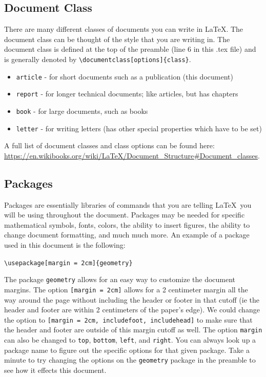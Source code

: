 \documentclass[]{article}%
\newcommand{\bs}{\textbackslash}
\newcommand{\TT}[1]{\texttt{#1}}
\theoremstyle{definition}
\begin{document}
\subsection{Document Class}
There are many different classes of documents you can write in \LaTeX.
The document class can be thought of the style that you are writing in.
The document class is defined at the top of the preamble (line 6 in this .tex file) and is generally denoted by \TT{\bs documentclass[options]\{class\}}.
\begin{itemize}
    \item \TT{article} - for short documents such as a publication (this document)
    \item \TT{report} - for longer technical documents; like articles, but has chapters 
    \item \TT{book} - for large documents, such as books 
    \item \TT{letter} - for writing letters (has other special properties which have to be set) 
\end{itemize}
A full list of document classes and class options can be found here: \url{https://en.wikibooks.org/wiki/LaTeX/Document_Structure#Document_classes}.

\subsection{Packages}
Packages are essentially libraries of commands that you are telling \LaTeX\ you will be using throughout the document.
Packages may be needed for specific mathematical symbols, fonts, colors, the ability to insert figures, the ability to change document formatting, and much much more.
An example of a package used in this document is the following:\\
\begin{center}
{\TT{\bs usepackage[margin = 2cm]\{geometry\}}}
\end{center}
The package \TT{geometry} allows for an easy way to customize the document margins.
The option \TT{[margin = 2cm]} allows for a 2 centimeter margin all the way around the page without including the header or footer in that cutoff (ie the header and footer are within 2 centimeters of the paper's edge).
We could change the option to \TT{[margin = 2cm, includefoot, includehead]} to make sure that the header and footer are outside of this margin cutoff as well.
The option \TT{margin} can also be changed to \TT{top}, \TT{bottom}, \TT{left}, and \TT{right}.
You can always look up a package name to figure out the specific options for that given package.
Take a minute to try changing the options on the \TT{geometry} package in the preamble to see how it effects this document.
%
\clearpage
\end{document}

